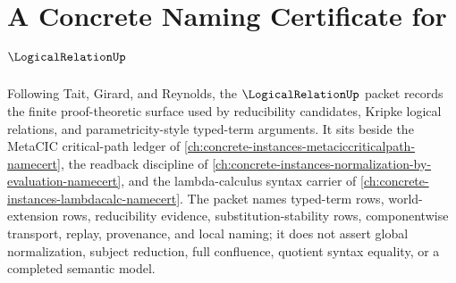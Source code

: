 \chapter{A Concrete Naming Certificate for $\LogicalRelationUp$}
\label{ch:concrete-instances-logical-relation-namecert}

Following Tait, Girard, and Reynolds, the $\LogicalRelationUp$ packet records the finite proof-theoretic surface used by reducibility candidates, Kripke logical relations, and parametricity-style typed-term arguments. It sits beside the MetaCIC critical-path ledger of \autoref{ch:concrete-instances-metaciccriticalpath-namecert}, the readback discipline of \autoref{ch:concrete-instances-normalization-by-evaluation-namecert}, and the lambda-calculus syntax carrier of \autoref{ch:concrete-instances-lambdacalc-namecert}. The packet names typed-term rows, world-extension rows, reducibility evidence, substitution-stability rows, componentwise transport, replay, provenance, and local naming; it does not assert global normalization, subject reduction, full confluence, quotient syntax equality, or a completed semantic model.

